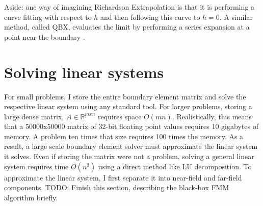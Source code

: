 \documentclass[a4paper]{article}
\begin{document}
Aside: one way of imagining Richardson Extrapolation is that it is performing a curve fitting with respect to $h$ and then following this curve to $h = 0$. A similar method, called QBX, evaluates the limit by performing a series expansion at a point near the boundary \citep{Klockner2013}.

\section*{Solving linear systems}
For small problems, I store the entire boundary element matrix and solve the respective linear system using any standard tool.  For larger problems, storing a large dense matrix, $A \in \mathbb{R}^{mxn}$ requires space $O(mn)$. Realistically, this means that a 50000x50000 matrix of 32-bit floating point values requires 10 gigabytes of memory. A problem ten times that size requires 100 times the memory. As a result, a large scale boundary element solver must approximate the linear system it solves. Even if storing the matrix were not a problem, solving a general linear system requires time $O(n^3)$ using a direct method like LU decomposition. 
To approximate the linear system, I first separate it into near-field and far-field components. TODO: Finish this section, describing the black-box FMM algorithm briefly. \citep{Fong2009}


\end{document}
